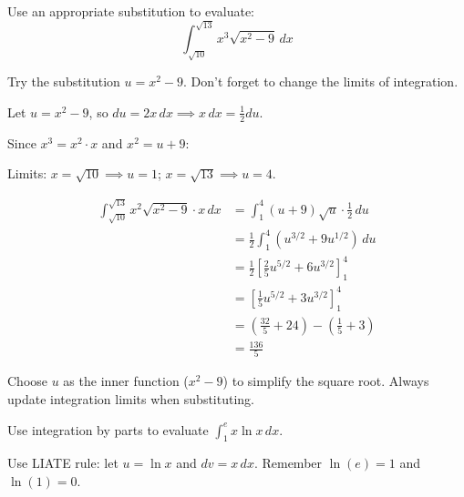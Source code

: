 
\begin{problem}
Use an appropriate substitution to evaluate:
\[
\int_{\sqrt{10}}^{\sqrt{13}} x^3 \sqrt{x^2 - 9} \, dx
\]
\end{problem}

\begin{hint}
Try the substitution $u = x^2 - 9$. Don't forget to change the limits of integration.
\end{hint}

\begin{solution}
Let $u = x^2 - 9$, so $du = 2x \, dx \implies x \, dx = \frac{1}{2}du$.

Since $x^3 = x^2 \cdot x$ and $x^2 = u + 9$:

Limits: $x = \sqrt{10} \implies u = 1$; $x = \sqrt{13} \implies u = 4$.

\begin{align*}
\int_{\sqrt{10}}^{\sqrt{13}} x^2 \sqrt{x^2 - 9} \cdot x \, dx &= \int_{1}^{4} (u + 9)\sqrt{u} \cdot \frac{1}{2} \, du \\
&= \frac{1}{2} \int_{1}^{4} (u^{3/2} + 9u^{1/2}) \, du \\
&= \frac{1}{2} \left[ \frac{2}{5}u^{5/2} + 6u^{3/2} \right]_{1}^{4} \\
&= \left[ \frac{1}{5}u^{5/2} + 3u^{3/2} \right]_{1}^{4} \\
&= \left(\frac{32}{5} + 24\right) - \left(\frac{1}{5} + 3\right) \\
&= \boxed{\frac{136}{5}}
\end{align*}
\end{solution}

\begin{takeaways}
Choose $u$ as the inner function ($x^2-9$) to simplify the square root. Always update integration limits when substituting.
\end{takeaways}

\vspace{1cm}

\begin{problem}
Use integration by parts to evaluate $\displaystyle \int_{1}^{e} x \ln x \, dx$.
\end{problem}

\begin{hint}
Use LIATE rule: let $u = \ln x$ and $dv = x \, dx$. Remember $\ln(e) = 1$ and $\ln(1) = 0$.
\end{hint}

